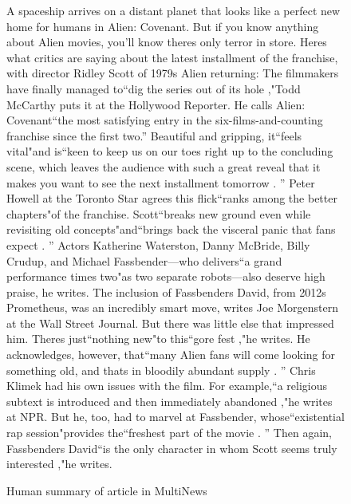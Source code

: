 \documentclass[../writeup.tex]{subfiles}
\begin{document}
\begin{figure}[h]
    \centering
    {\small A spaceship arrives on a distant planet that looks like a perfect new home for humans in Alien: Covenant.
        But if you know anything about Alien movies, you'll know theres only terror in store.
        Heres what critics are saying about the latest installment of the franchise, with director Ridley Scott of 1979s Alien returning: The filmmakers have finally managed to``dig the series out of its hole ,"Todd McCarthy puts it at the Hollywood Reporter.
        He calls Alien: Covenant``the most satisfying entry in the six-films-and-counting franchise since the first two.''
        Beautiful and gripping, it``feels vital"and is``keen to keep us on our toes right up to the concluding scene, which leaves the audience with such a great reveal that it makes you want to see the next installment tomorrow . ''
        Peter Howell at the Toronto Star agrees this flick``ranks among the better chapters"of the franchise.
        Scott``breaks new ground even while revisiting old concepts"and``brings back the visceral panic that fans expect . ''
        Actors Katherine Waterston, Danny McBride, Billy Crudup, and Michael Fassbender—who delivers``a grand performance times two"as two separate robots—also deserve high praise, he writes.
        The inclusion of Fassbenders David, from 2012s Prometheus, was an incredibly smart move, writes Joe Morgenstern at the Wall Street Journal.
        But there was little else that impressed him. Theres just``nothing new"to this``gore fest ,"he writes.
        He acknowledges, however, that``many Alien fans will come looking for something old, and thats in bloodily abundant supply . ''
        Chris Klimek had his own issues with the film.
        For example,``a religious subtext is introduced and then immediately abandoned ,"he writes at NPR.
        But he, too, had to marvel at Fassbender, whose``existential rap session"provides the``freshest part of the movie . ''
        Then again, Fassbenders David``is the only character in whom Scott seems truly interested ,"he writes.}
    \caption{Human summary of article in MultiNews}
    \label{appendix:fig:summaries:human_multi}
\end{figure}
\end{document}
